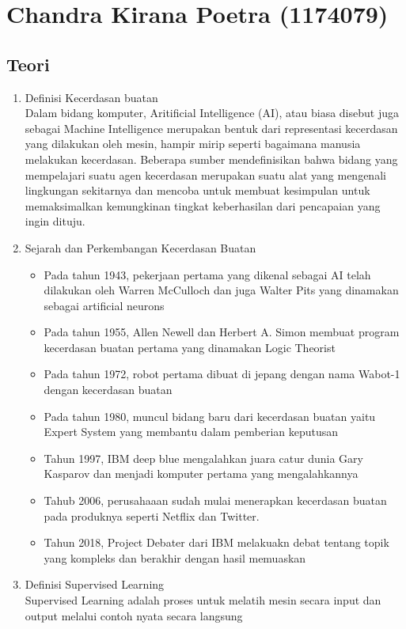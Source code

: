 \section{Chandra Kirana Poetra (1174079)}
\subsection{Teori}
\begin{enumerate}
\item Definisi Kecerdasan buatan\\ 
Dalam bidang komputer, Aritificial Intelligence (AI), atau biasa disebut juga sebagai Machine Intelligence merupakan bentuk dari representasi kecerdasan yang dilakukan oleh mesin, hampir mirip seperti bagaimana manusia melakukan kecerdasan. Beberapa sumber mendefinisikan  bahwa bidang yang mempelajari suatu agen kecerdasan merupakan suatu alat yang mengenali lingkungan sekitarnya dan mencoba untuk membuat kesimpulan untuk memaksimalkan kemungkinan tingkat keberhasilan dari pencapaian yang ingin dituju.

\item Sejarah dan Perkembangan Kecerdasan Buatan
\begin{itemize}
\item Pada tahun 1943, pekerjaan pertama yang dikenal sebagai AI telah dilakukan oleh Warren McCulloch dan juga Walter Pits yang dinamakan sebagai artificial neurons
\item Pada tahun 1955, Allen Newell dan Herbert A. Simon membuat program kecerdasan buatan pertama yang dinamakan Logic Theorist
\item Pada tahun 1972, robot pertama dibuat di jepang dengan nama Wabot-1 dengan kecerdasan buatan
\item Pada tahun 1980, muncul bidang baru dari kecerdasan buatan yaitu Expert System yang membantu dalam pemberian keputusan
\item Tahun 1997, IBM deep blue mengalahkan juara catur dunia Gary Kasparov dan menjadi komputer pertama yang mengalahkannya
\item Tahub 2006, perusahaaan sudah mulai menerapkan kecerdasan buatan pada produknya seperti Netflix dan Twitter.
\item Tahun 2018, Project Debater dari IBM melakuakn debat tentang topik yang kompleks dan berakhir dengan hasil memuaskan
\end{itemize}

\item Definisi Supervised Learning\\
Supervised Learning adalah proses untuk melatih mesin secara input dan output melalui contoh nyata secara langsung


\end{enumerate}
